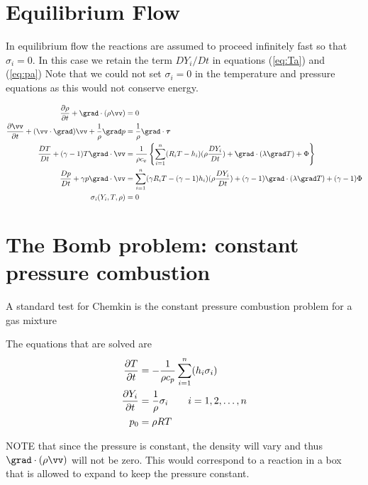 \documentclass[10pt]{article}
\begin{document}
\section{Equilibrium Flow}

In equilibrium flow the reactions are assumed to proceed infinitely fast so that $\sigma_i=0$. 
In this case we retain the term $DY_i/Dt$ in equations (\ref{eq:Ta}) and (\ref{eq:pa})
Note that we could not set $\sigma_i=0$ in the temperature and pressure equations as this
would not conserve energy.


\begin{align*}
   {\partial \rho  \over \partial t} + \grad\cdot(\rho \vv)&=0 \\
   {\partial \vv  \over \partial t}  + (\vv\cdot\grad)\vv +{1\over\rho} \grad p &= {1\over\rho}\grad\cdot\tauv \\
  {D T\over Dt} + (\gamma-1) T \grad\cdot\vv & = 
       {1\over \rho c_v}  \left\{ \sumi  (R_i T-h_i) (\rho{D Y_i\over Dt}) + \grad\cdot(\lambda\grad T)
              + \Phi \right\}  \\
    {D p\over Dt} + \gamma p \grad\cdot\vv &= 
        \sumi  ({\gamma R_i} T- (\gamma-1)h_i) (\rho{D Y_i\over Dt}) + (\gamma-1) \grad\cdot(\lambda\grad T)
              + (\gamma-1) \Phi \\
   \sigma_i(Y_i,T,\rho) & = 0 
\end{align*}

\section{The Bomb problem: constant pressure combustion}

A standard test for Chemkin is the constant pressure combustion problem for a gas mixture

The equations that are solved are
\begin{align*}
   {\partial T\over \partial t} &= - {1\over \rho c_p} \sum_{i=1}^n (h_i\sigma_i)   \\
   {\partial Y_i\over \partial t} &= {1\over \rho }  \sigma_i \qquad i=1,2,\ldots,n \\
   p_0 &= \rho R T
\end{align*}

NOTE that since the pressure is constant, the density will vary and thus $\grad\cdot(\rho\vv)$
will not be zero. This would correspond to a reaction in a box that is allowed to expand to
keep the pressure constant.
\end{document}
